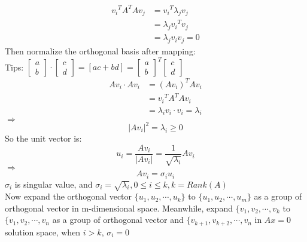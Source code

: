 \documentclass[]{article}
\begin{document}
\begin{equation}
\begin{split}
{v_{i}}^{T}A^{T}Av_{j}&={v_{i}}^{T}\lambda_{j}v_{j}\\
&=\lambda_{j}{v_{i}}^{T}v_{j}\\
&=\lambda_{j}v_{i}v_{j}=0
\end{split}
\end{equation} 
Then normalize the orthogonal basis after mapping:\\
Tips:
$\left[\begin{matrix}
a\\b
\end{matrix}\right]\cdot \left[\begin{matrix}
c\\d
\end{matrix}\right]= [ac+bd]={\left[\begin{matrix}
a\\b
\end{matrix}\right]}^{T} \left[\begin{matrix}
c\\d
\end{matrix}\right]$ 
\begin{equation}
\begin{split}
Av_{i}\cdot Av_{i}&=(Av_{i})^{T}Av_{i}\\
&={v_{i}}^{T}A^{T}Av_{i}\\
&=\lambda_{i}v_{i}\cdot v_{i}=\lambda_{i}
\end{split}
\end{equation}
 $\Rightarrow$
\begin{equation}
  |Av_{i}|^{2}=\lambda_{i}\ge 0
\end{equation}
So the unit vector is:
\begin{equation}
  u_{i}=\frac{Av_{i}}{|Av_{i}|}=\frac{1}{\sqrt{\lambda_{i}}}Av_{i}
\end{equation}
$\Rightarrow$
\begin{equation}
Av_{i}=\sigma_{i}u_{i} 
\end{equation}
$\sigma_{i}$ is singular value,  and $\sigma_{i}=\sqrt{\lambda_{i}}, 0\le i\le k, k=Rank(A)$\\
Now expand the orthogonal vector $\{u_{1},u_{2},\cdots,u_{k}\}$ to $\{u_{1},u_{2},\cdots,u_{m}\}$ as a group of orthogonal vector in m-dimensional space.  Meanwhile,  expand $\{ v_{1},v_{2},\cdots,v_{k}$ to $\{ v_{1},v_{2},\cdots,v_{n}$ as a group of orthogonal vector and $\{ v_{k+1},v_{k+2},\cdots,v_{n}$ in $Ax=0$ solution space,  when $i>k$, $\sigma_{i}=0$
\end{document}
